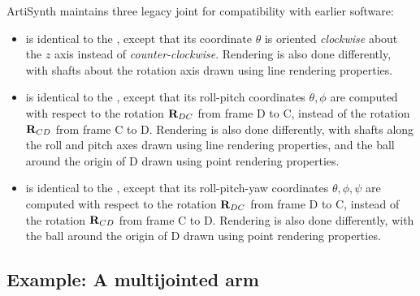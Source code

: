 ArtiSynth maintains three legacy joint for compatibility with earlier
software:

\begin{itemize}

\item {} is identical
to the , except that
its coordinate $\theta$ is oriented {\it clockwise} about the $z$ axis
instead of {\it counter-clockwise}. Rendering is also done
differently, with shafts about the rotation axis drawn using
line rendering properties.

\item {} is identical
to the , except
that its roll-pitch coordinates $\theta, \phi$ are computed with
respect to the rotation ${\bf R}_{DC}$ from frame D to C, instead of the
rotation ${\bf R}_{CD}$ from frame C to D. Rendering is also done
differently, with shafts along the roll and pitch axes drawn
using line rendering properties, and the ball around the
origin of D drawn using point rendering properties.

\item {}
is identical to
the , except that
its roll-pitch-yaw coordinates $\theta, \phi, \psi$ are computed with
respect to the rotation ${\bf R}_{DC}$ from frame D to C, instead of the
rotation ${\bf R}_{CD}$ from frame C to D. Rendering is also done
differently, with the ball around the origin of D drawn using point
rendering properties.

\end{itemize}

\subsection{Example: A multijointed arm}

\label{MultiJointedArm:sec}

